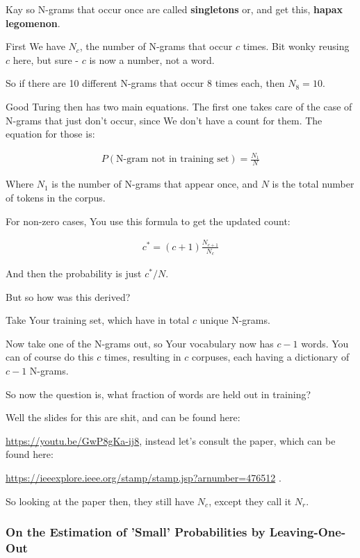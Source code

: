 \documentclass{article}
\begin{document}
			Kay so N-grams that occur once are called \textbf{singletons} or, and get this, \textbf{hapax legomenon}.
			
			First We have $N_c$, the number of N-grams that occur $c$ times. Bit wonky reusing $c$ here, but sure - $c$ is now a number, not a word.
			
			So if there are 10 different N-grams that occur 8 times each, then $N_8 = 10$.
			
			Good Turing then has two main equations. The first one takes care of the case of N-grams that just don't occur, since We don't have a count for them. The equation for those is:
			
			\begin{align}
				P(\text{N-gram not in training set}) = \frac{N_1}{N}
			\end{align}
	
			Where $N_1$ is the number of N-grams that appear once, and $N$ is the total number of tokens in the corpus.
			
			For non-zero cases, You use this formula to get the updated count:
						
			\begin{align}
				c^* = (c+1)\frac{N_{c+1}}{N_c}
			\end{align}
			
			And then the probability is just $c^*/N$.
			
			But so how was this derived?
			
			Take Your training set, which have in total $c$ unique N-grams.
			
			Now take one of the N-grams out, so Your vocabulary now has $c-1$ words. You can of course do this $c$ times, resulting in $c$ corpuses, each having a dictionary of $c-1$ N-grams.
			
			So now the question is, what fraction of words are held out in training? 
			
			Well the slides for this are shit, and can be found here: 
			
			\url{https://youtu.be/GwP8gKa-ij8}, instead let's consult the paper, which can be found here: 
			
			\url{https://ieeexplore.ieee.org/stamp/stamp.jsp?arnumber=476512} .
			
			So looking at the paper then, they still have $N_c$, except they call it $N_r$.
			
		\subsubsection{On the Estimation of 'Small' Probabilities
by Leaving-One-Out}
\end{document}
